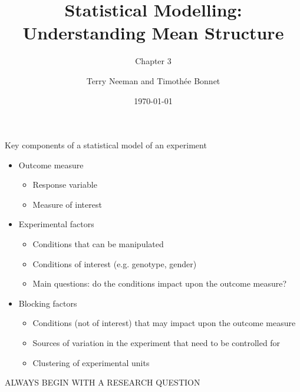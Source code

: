 \documentclass[10pt]{beamer}
\title{Statistical Modelling: Understanding Mean Structure}
\subtitle{Chapter 3}
\author{Terry Neeman and Timoth\'ee Bonnet}
\date{\today}
\begin{document}



\begin{frame}{}
\maketitle

\end{frame}


\begin{frame}{Key components of a statistical model of an experiment}
\begin{itemize}
  \item Outcome measure
  \begin{itemize}
   \item Response variable
   \item Measure of interest
  \end{itemize}
  \item Experimental factors 
  \begin{itemize}
   \item Conditions that can be manipulated 
   \item Conditions of interest (e.g. genotype, gender) 
   \item Main questions: do the conditions impact upon the outcome measure?
  \end{itemize}
  \item Blocking factors
  \begin{itemize}
   \item Conditions (not of interest) that may impact upon the outcome measure
   \item Sources of variation in the experiment that need to be controlled for
   \item Clustering of experimental units
  \end{itemize}
\end{itemize}

\vspace{0.2cm}
ALWAYS BEGIN WITH A RESEARCH QUESTION

\end{frame}
\end{document}
